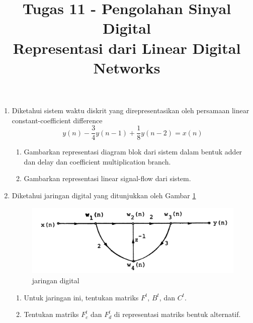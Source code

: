 \documentclass[12pt,a4paper]{article}
\title{Tugas 11 - Pengolahan Sinyal Digital\\
	Representasi dari Linear Digital Networks}
\date{}
\begin{document}
	\maketitle
	\date{}
	\begin{enumerate}
		\item Diketahui sistem waktu diskrit yang direpresentasikan oleh persamaan linear constant-coefficient difference \[ y(n) - \frac{3}{4} y(n-1) + \frac{1}{8} y(n-2) = x(n) \]
		\begin{enumerate}
			\item Gambarkan representasi diagram blok dari sistem dalam bentuk adder dan delay dan coefficient multiplication branch.
			\item Gambarkan representasi linear signal-flow dari sistem.
		\end{enumerate}
		\item Diketahui jaringan digital yang ditunjukkan oleh Gambar \ref{fig:img04}
		
		\begin{figure}[H]
			\centering
			\includegraphics[width=0.5\linewidth]{img/img04}
			\caption{jaringan digital}
			\label{fig:img04}
		\end{figure}
		
		\begin{enumerate}
			\item Untuk jaringan ini, tentukan matriks $ F^t $, $ B^t $, dan $ C^t $.
			\item Tentukan matriks $ F_c^t $ dan $ F_d^t $ di representasi matriks bentuk alternatif.
		\end{enumerate}
	\end{enumerate}
\end{document}
